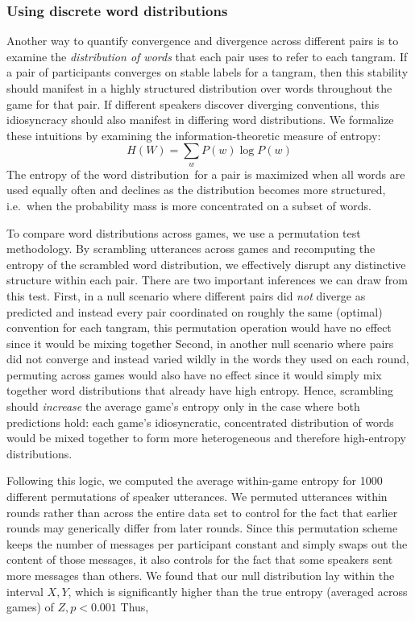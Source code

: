 \documentclass[alpha-refs]{wiley-article}
\begin{document}
\subsubsection{Using discrete word distributions}
Another way to quantify convergence and divergence across different pairs is to examine the \emph{distribution of words} that each pair uses to refer to each tangram.
If a pair of participants converges on stable labels for a tangram, then this stability should manifest in a highly structured distribution over words throughout the game for that pair.
If different speakers discover diverging conventions, this idiosyncracy should also manifest in differing word distributions.
We formalize these intuitions by examining the information-theoretic measure of entropy: $$H(W) = \sum_w P(w) \log P(w)$$
The entropy of the word distribution for a pair is maximized when all words are used equally often and declines as the distribution becomes more structured, i.e.~when the probability mass is more concentrated on a subset of words.

To compare word distributions across games, we use a permutation test methodology.
By scrambling utterances across games and recomputing the entropy of the scrambled word distribution, we effectively disrupt any distinctive structure within each pair.
There are two important inferences we can draw from this test.
First, in a null scenario where different pairs did \emph{not} diverge as predicted and instead every pair coordinated on roughly the same (optimal) convention for each tangram, this permutation operation would have no effect since it would be mixing together 
Second, in another null scenario where pairs did not converge and instead varied wildly in the words they used on each round, permuting across games would also have no effect since it would simply mix together word distributions that already have high entropy.
Hence, scrambling should \emph{increase} the average game's entropy only in the case where both predictions hold: each game's idiosyncratic, concentrated distribution of words would be mixed together to form more heterogeneous and therefore high-entropy distributions.

Following this logic, we computed the average within-game entropy for 1000 different permutations of speaker utterances. 
We permuted utterances within rounds rather than across the entire data set to control for the fact that earlier rounds may generically differ from later rounds. 
Since this permutation scheme keeps the number of messages per participant constant and simply swaps out the content of those messages, it also controls for the fact that some speakers sent more messages than others. 
We found that our null distribution lay within the interval $X, Y$, which is significantly higher than the true entropy (averaged across games) of $Z, p < 0.001$
Thus, 
\end{document}
